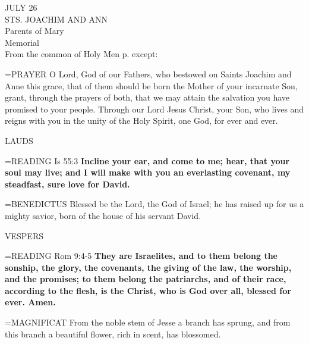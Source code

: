 \begin{center}\normalsize JULY 26\\
\footnotesize STS. JOACHIM AND ANN\\
\footnotesize Parents of Mary\\
\footnotesize Memorial\\
\footnotesize From the common of Holy Men p.     except:\\
\end{center}

\hangindent=\parindent \small{PRAYER 
O Lord, God of our Fathers,
who bestowed on Saints Joachim and Anne this grace,
that of them should be born the Mother of your incarnate Son,
grant, through the prayers of both,
that we may attain the salvation
you have promised to your people.
Through our Lord Jesus Christ, your Son,
who lives and reigns with you in the unity of the Holy Spirit,
one God, for ever and ever.\\}
 
\begin{flushleft}\normalsize LAUDS\\\end{flushleft}

\hangindent=\parindent \small{READING} Is 55:3 \textbf{Incline your ear, and come to me; hear, that your
soul may live; and I will make with you an everlasting covenant, my
steadfast, sure love for David.\\}
 
\hangindent=\parindent \small{BENEDICTUS  Blessed be the Lord, the God of Israel; he has raised up
for us a mighty savior, born of the house of his servant David.\\}
 
\begin{flushleft}\normalsize VESPERS\\\end{flushleft}

\hangindent=\parindent \small{READING} Rom 9:4-5 \textbf{They are Israelites, and to them belong the
sonship, the glory, the covenants, the giving of the law, the worship,
and the promises; to them belong the patriarchs, and of their race,
according to the flesh, is the Christ, who is God over all, blessed
for ever. Amen.\\}
 
\hangindent=\parindent \small{MAGNIFICAT  From the noble stem of Jesse a branch has sprung, and
from this branch a beautiful flower, rich in scent, has blossomed.\\}
 
